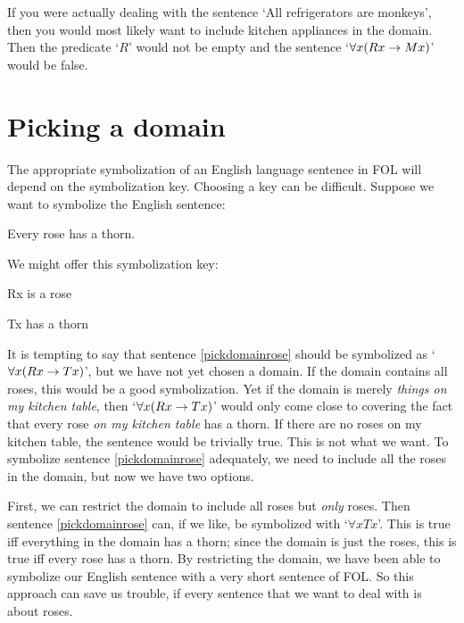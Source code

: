 If you were actually dealing with the sentence `All refrigerators are monkeys', then you would most likely want to include kitchen appliances in the domain. Then the predicate `$R$' would not be empty and the sentence `$\forall x(Rx \rightarrow Mx)$' would be false.


\section{Picking a domain}
The appropriate symbolization of an English language sentence in FOL will depend on the symbolization key. Choosing a key can be difficult. Suppose we want to symbolize the English sentence:
	\begin{earg}
		\item[\ex{pickdomainrose}] Every rose has a thorn.
	\end{earg}
We might offer this symbolization key:
	\begin{ekey}
		\item[Rx]  is a rose
		\item[Tx]  has a thorn
	\end{ekey}
It is tempting to say that sentence \ref{pickdomainrose} should be symbolized as `$\forall x(Rx \rightarrow Tx)$', but we have not yet chosen a domain. If the domain contains all roses, this would be a good symbolization. Yet if the domain is merely \emph{things on my kitchen table}, then `$\forall x(Rx \rightarrow Tx)$' would only come close to covering the fact that every rose \emph{on my kitchen table} has a thorn. If there are no roses on my kitchen table, the sentence would be trivially true. This is not what we want. To symbolize sentence \ref{pickdomainrose} adequately, we need to include all the roses in the domain, but now we have two options. 

First, we can restrict the domain to include all roses but \emph{only} roses. Then sentence \ref{pickdomainrose} can, if we like, be symbolized with `$\forall x Tx$'. This is true iff everything in the domain has a thorn; since the domain is just the roses, this is true iff every rose has a thorn. By restricting the domain, we have been able to symbolize our English sentence with a very short sentence of FOL. So this approach can save us trouble, if every sentence that we want to deal with is about roses.

